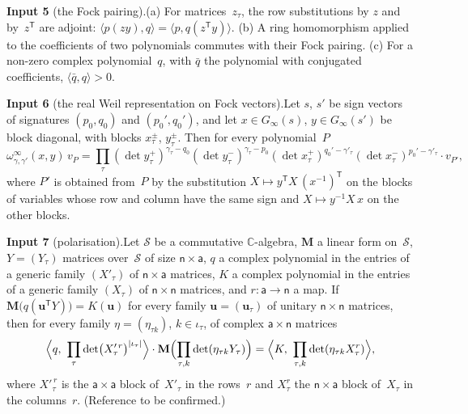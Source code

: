 \documentclass[11pt,a4paper]{article}
\newcommand{\m}[1]{\mbox{$#1$}}        %
\theoremstyle{plainx}
\theoremstyle{uprightx}
\newcommand{\CC}{\mathbb{C}}
\newcommand{\ix}[1]{\mathsf{#1}}
\newcommand{\ip}[2]{\langle #1,#2\rangle}
\newcommand{\transp}{^{\mathsf{T}}}
\begin{document}
{\vspace{3pt}\textbf{Input 5} (the Fock pairing).\enspace (a) For matrices~$z_\tau$, the row substitutions by $z$ and
by~$z\transp$ are adjoint: \m{\ip{p(zy)}{q}=\ip{p}{q(z\transp y)}}. (b) A ring homomorphism applied to the coefficients of
two polynomials commutes with their Fock pairing. (c) For a non-zero complex polynomial~$q$, with $\bar q$ the
polynomial with conjugated coefficients, \m{\ip{\bar q}{q}>0}.

\vspace{3pt}\textbf{Input 6} (the real Weil representation on Fock vectors).\enspace Let $s$, $s'$ be sign vectors of
signatures \m{(p_0,q_0)} and \m{(p_0',q_0')}, and let \m{x\in G_\infty(s)}, \m{y\in G_\infty(s')} be block diagonal, with
blocks \m{x^{\pm}_\tau}, \m{y^{\pm}_\tau}. Then for every polynomial~$P$
\[\omega^{\infty}_{\gamma,\gamma'}(x,y)\,v_P=\prod_\tau(\det y^{+}_\tau)^{\gamma_\tau-q_0}(\det y^{-}_\tau)^{\gamma_\tau-p_0}(\det x^{+}_\tau)^{q_0'-\gamma'_\tau}(\det x^{-}_\tau)^{p_0'-\gamma'_\tau}\cdot v_{P'},\]
where $P'$ is obtained from~$P$ by the substitution \m{X\mapsto y\transp X\,(x^{-1})\transp} on the blocks of variables
whose row and column have the same sign and \m{X\mapsto y^{-1}X\,x} on the other blocks.

\vspace{3pt}\textbf{Input 7} (polarisation).\enspace Let $\mathcal{S}$ be a commutative $\CC$-algebra, $\mathbf{M}$ a linear
form on~$\mathcal{S}$, \m{Y=(Y_\tau)} matrices over~$\mathcal{S}$ of size \m{\ix n\times\ix a}, $q$ a complex polynomial
in the entries of a generic family \m{(X'_\tau)} of \m{\ix n\times\ix a} matrices, $K$ a complex polynomial in the
entries of a generic family \m{(X_\tau)} of \m{\ix n\times\ix n} matrices, and \m{r\colon\ix a\to\ix n} a map. If
\m{\mathbf{M}\bigl(q(\mathbf{u}\transp Y)\bigr)=K(\mathbf{u})} for every family \m{\mathbf{u}=(\mathbf{u}_\tau)} of unitary \m{\ix n\times\ix n} matrices, then for
every family \m{\eta=(\eta_{\tau k})}, \m{k\in\iota_\tau}, of complex \m{\ix a\times\ix n} matrices
\[\Bigl\langle q,\ \prod_\tau\det\bigl(X'^{\,r}_\tau\bigr)^{|\iota_\tau|}\Bigr\rangle\cdot \mathbf{M}\Bigl(\prod_{\tau,k}\det(\eta_{\tau k}Y_\tau)\Bigr)
=\Bigl\langle K,\ \prod_{\tau,k}\det(\eta_{\tau k}X^{r}_\tau)\Bigr\rangle,\]
where \m{X'^{\,r}_\tau} is the \m{\ix a\times\ix a} block of~$X'_\tau$ in the rows~$r$ and \m{X^{r}_\tau} the
\m{\ix n\times\ix a} block of~$X_\tau$ in the columns~$r$. (Reference to be confirmed.)}
\end{document}

